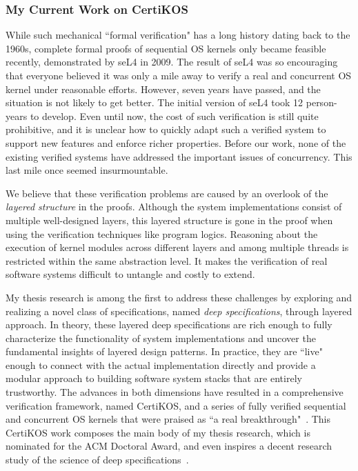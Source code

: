 \documentclass[a4paper, 10pt]{article}
\begin{document}
\begin{small}

\subsubsection*{\large My Current Work on CertiKOS}

While such mechanical ``formal verification" has a long history dating back to the 1960s, 
complete formal proofs of sequential OS kernels only became feasible recently, demonstrated by
seL4 in 2009. The result of seL4 was so encouraging that everyone
believed it was only a mile away to verify a real and concurrent OS kernel under reasonable efforts. However, seven years have passed,
and the situation is not likely to get better. 
The initial version of seL4 took 12 person-years to develop.
Even until now, the cost of such verification is still quite prohibitive,
 and it is unclear how to quickly adapt such a verified system to support new features and enforce richer properties. 
Before our work, none of the existing verified systems have addressed the important
issues of concurrency.
This last mile once seemed insurmountable.

 
We believe that these verification problems
are caused by an overlook of the \emph{layered structure} in the proofs.
Although the system implementations consist of multiple
well-designed layers, this layered structure
is gone in the proof when using the verification techniques like  program logics.
Reasoning about the execution of kernel modules across different layers and among multiple threads is restricted within 
the same abstraction level. It makes the verification
of real software systems  difficult to untangle
and costly to extend.

My thesis research is among the first to address these challenges
by exploring and realizing a novel class of specifications, named \emph{deep specifications}, through layered approach.
In theory, these layered deep specifications are rich
enough to fully characterize the functionality of system implementations
and
uncover the fundamental
insights of  layered design patterns. In practice, they are ``live" enough to  connect   with the actual  implementation directly and provide a modular approach to building
 software system stacks that are entirely trustworthy.
The advances in both dimensions have resulted in a comprehensive
verification framework, named CertiKOS, and
a series of fully verified sequential and concurrent OS kernels that were praised as ``a real breakthrough"~\cite{news, dnews}.
This CertiKOS work composes the main body of my thesis research, which is nominated for the ACM Doctoral Award,
and even inspires a decent research study of the science of deep specifications~\cite{deepspec}.



\end{small}
\end{document}
